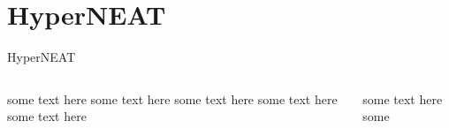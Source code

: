 \documentclass{beamer}
\begin{document}
\section{HyperNEAT}
\begin{frame}{HyperNEAT}
    \begin{columns}
        \begin{column}{0.5\textwidth}
            some text here some text here some text here some text here some text here
        \end{column}
        \begin{column}{0.5\textwidth}  %
            some text here some
        \end{column}
    \end{columns}
\end{frame}
\end{document}
